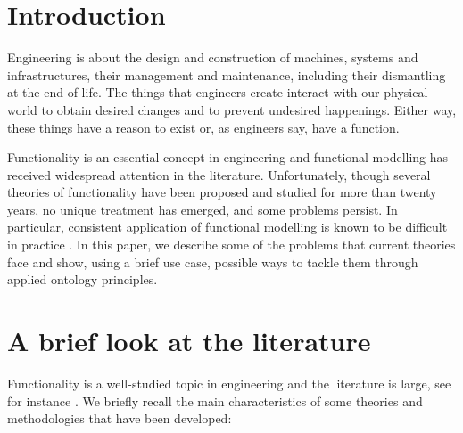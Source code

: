 \documentclass[
]{ceurart}
\begin{document}
\maketitle


\section{Introduction}
    
Engineering is about the design and construction of machines, systems and infrastructures, their management and maintenance, including their dismantling at the end of life. The things that engineers create interact with our physical world to obtain desired changes and to prevent undesired happenings. Either way, these things have a reason to exist or, as engineers say, have a function. 

Functionality is an essential concept in engineering and functional modelling has received widespread attention in the literature. 
Unfortunately, though several theories of functionality have been proposed and studied for more than twenty years, no unique treatment has emerged, and some problems persist. In particular, consistent application of functional modelling is known to be difficult in practice \cite{eckertThatWhichNot2013}.
In this paper, we describe some of the problems that current theories face and show, using a brief use case, possible ways to tackle them through applied ontology principles. 

\section{A brief look at the literature}\label{sec:literature}

Functionality is a well-studied topic in engineering and the literature is large, %
see for instance \cite{pahl_engineering_2007,erdenReviewFunctionModeling2008}. %
We briefly recall the main characteristics of some theories and methodologies that have been developed: %
\end{document}
